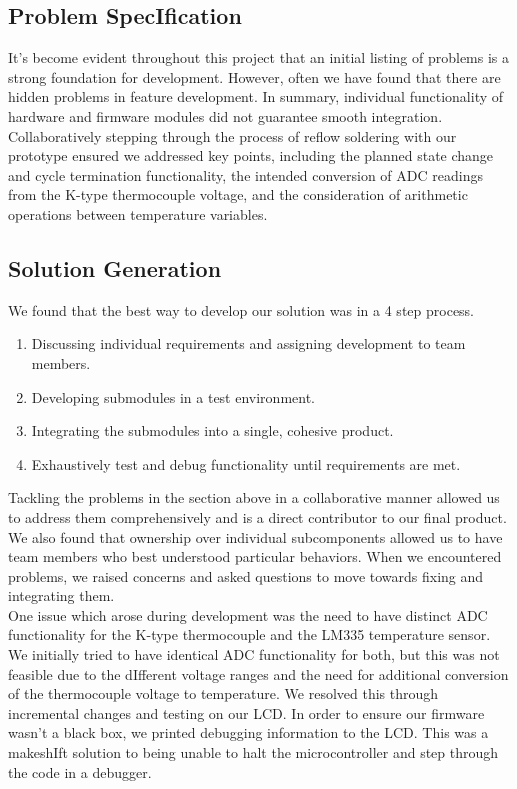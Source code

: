 \documentclass{article}
\begin{document}
\subsection{Problem SpecIfication}

It's become evident throughout this project that an initial listing of problems is a strong foundation for development. However,
often we have found that there are hidden problems in feature development. In summary, individual functionality of hardware and firmware modules did not
guarantee smooth integration. Collaboratively stepping through the process of reflow soldering with our prototype ensured we addressed key points, including the
planned state change and cycle termination functionality, the intended conversion of ADC readings from the K-type thermocouple voltage, and the consideration of
arithmetic operations between temperature variables.

\subsection{Solution Generation}

We found that the best way to develop our solution was in a 4 step process.

\begin{enumerate}
  \item Discussing individual requirements and assigning development to team members.
  \item Developing submodules in a test environment.
  \item Integrating the submodules into a single, cohesive product.
  \item Exhaustively test and debug functionality until requirements are met.
\end{enumerate}

\noindent Tackling the problems in the section above in a collaborative manner allowed us to address them comprehensively and is a direct contributor
to our final product. We also found that ownership over individual subcomponents allowed us to have team members who best understood particular behaviors.
When we encountered problems, we raised concerns and asked questions to move towards fixing and integrating them. \\

\noindent One issue which arose during development was the need to have distinct ADC functionality for the K-type thermocouple and the LM335 temperature sensor.
We initially tried to have identical ADC functionality for both, but this was not feasible due to the dIfferent voltage ranges and the need for additional conversion of
the thermocouple voltage to temperature. We resolved this through incremental changes and testing on our LCD. In order to ensure our firmware wasn't a black box, we printed
debugging information to the LCD. This was a makeshIft solution to being unable to halt the microcontroller and step through the code in a debugger.
\end{document}

